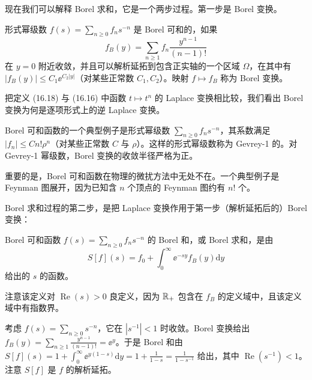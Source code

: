 现在我们可以解释 Borel 求和，它是一个两步过程。第一步是 Borel 变换。

\begin{definition}[16.8] 形式幂级数 $f(s)=\sum_{n\ge0}f_ns^{-n}$ 是 Borel 可和的，如果
\begin{equation}
f_B(y)=\sum_{n\ge1}f_n\frac{y^{n-1}}{(n-1)!}
\tag{16.18}
\end{equation}
在 $y=0$ 附近收敛，并且可以解析延拓到包含正实轴的一个区域 $\Omega$，在其中有 $|f_B(y)|\le C_1\ee^{C_2|y|}$（对某些正常数 $C_1,C_2$）。映射 $f\mapsto f_B$ 称为 Borel 变换。\end{definition}

把定义 (16.18) 与 (16.16) 中函数 $t\mapsto t^n$ 的 Laplace 变换相比较，我们看出 Borel 变换为何是逐项形式上的逆 Laplace 变换。

Borel 可和函数的一个典型例子是形式幂级数 $\sum_{n\ge0}f_ns^{-n}$，其系数满足 $|f_n|\le Cn!\rho^n$（对某些正常数 $C$ 与 $\rho$）。这样的形式幂级数称为 Gevrey-1 的。对 Gevrey-1 幂级数，Borel 变换的收敛半径严格为正。

重要的是，Borel 可和函数在物理的微扰方法中无处不在。一个典型例子是 Feynman 图展开，因为已知含 $n$ 个顶点的 Feynman 图约有 $n!$ 个。

Borel 求和过程的第二步，是把 Laplace 变换作用于第一步（解析延拓后的）Borel 变换：

\begin{definition}[16.9] Borel 可和函数 $f(s)=\sum_{n\ge0}f_ns^{-n}$ 的 Borel 和，或 Borel 求和，是由
\begin{equation}
S[f](s)=f_0+\int_0^\infty\ee^{-sy}f_B(y)\mathrm{d}y
\tag{16.19}
\end{equation}
给出的 $s$ 的函数。\end{definition}

注意该定义对 $\operatorname{Re}(s)>0$ 良定义，因为 $\mathbb{R}_+$ 包含在 $f_B$ 的定义域中，且该定义域中有指数界。

\begin{example}[16.10] 考虑 $f(s)=\sum_{n\ge0}s^{-n}$，它在 $|s^{-1}|<1$ 时收敛。Borel 变换给出 $f_B(y)=\sum_{n\ge1}\frac{y^{n-1}}{(n-1)!}=\ee^y$。于是 Borel 和由 $S[f](s)=1+\int_0^\infty\ee^{y(1-s)}\mathrm{d}y=1+\frac{1}{1-s}=\frac{1}{1-s^{-1}}$ 给出，其中 $\operatorname{Re}(s^{-1})<1$。注意 $S[f]$ 是 $f$ 的解析延拓。\end{example}


